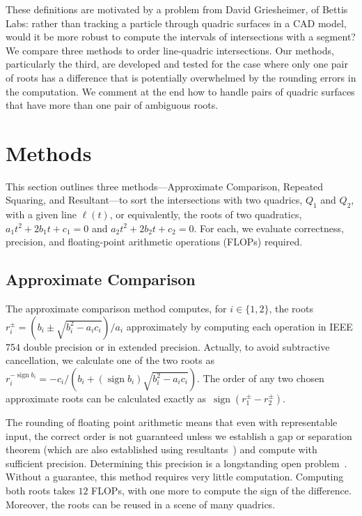 \documentclass{cccg16}
\DeclareMathOperator{\sign}{sign}
\begin{document}
These definitions are motivated by a problem from David Griesheimer,
of Bettis Labs: rather than tracking a particle through quadric
surfaces in a CAD model, would it be more robust to compute the
intervals of intersections with a segment?  We compare three methods
to order line-quadric intersections.  Our methods, particularly the
third, are  developed and tested for the case where only
one pair of roots has a difference that is potentially overwhelmed by
the rounding errors in the computation. We comment at the end how to
handle pairs of quadric surfaces that have more than one pair of
ambiguous roots.

\section{Methods}
This section outlines three methods---Approximate Comparison, Repeated
Squaring, and Resultant---to sort the intersections with two quadrics,
$Q_1$ and $Q_2$, with a given line $\ell(t)$, or equivalently, the
roots of two quadratics, $a_1t^2+2b_1t+c_1=0$ and
$a_2t^2+2b_2t+c_2=0$.  For each, we evaluate correctness, precision,
and floating-point arithmetic operations (FLOPs) required.

\subsection{Approximate Comparison}
The approximate comparison method computes, for $i\in\{1, 2\}$, the
roots~$r_i^\pm=({b_i\pm\sqrt{b_i^2-a_ic_i}})/{a_i}$ approximately by
computing each operation in IEEE 754 double precision or in extended
precision.  Actually, to avoid subtractive cancellation, we calculate
one of the two roots as $r_i^{-\sign
  b_i}=-c_i/({b_i+(\sign{b_i})\sqrt{b_i^2-a_ic_i}})$.  The order of
any two chosen approximate roots can be calculated exactly
as~$\sign(r_1^\pm-r_2^\pm)$.

The rounding of floating point arithmetic means that even with
representable input, the correct order is not guaranteed unless we
establish a gap or separation theorem (which are also established
using resultants~\cite{brownawell2009lower,emiris2010dmm}) and compute with sufficient
precision. Determining this precision is a longstanding open problem~\cite{demaine33open}.
Without a guarantee, this method requires very little computation.  
 Computing both roots takes $12$ FLOPs, with one more to
compute the sign of the difference.  Moreover, the roots can be reused
in a scene of many quadrics.
\end{document}
